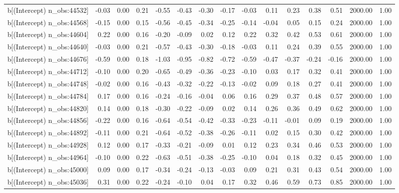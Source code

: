 \begin{table}[ht]
\begin{tabular}{rrrrrrrrrrrrrrr}
  b[(Intercept) n\_obs:44532] & -0.03 & 0.00 & 0.21 & -0.55 & -0.43 & -0.30 & -0.17 & -0.03 & 0.11 & 0.23 & 0.38 & 0.51 & 2000.00 & 1.00 \\ 
  b[(Intercept) n\_obs:44568] & -0.15 & 0.00 & 0.15 & -0.56 & -0.45 & -0.34 & -0.25 & -0.14 & -0.04 & 0.05 & 0.15 & 0.24 & 2000.00 & 1.00 \\ 
  b[(Intercept) n\_obs:44604] & 0.22 & 0.00 & 0.16 & -0.20 & -0.09 & 0.02 & 0.12 & 0.22 & 0.32 & 0.42 & 0.53 & 0.61 & 2000.00 & 1.00 \\ 
  b[(Intercept) n\_obs:44640] & -0.03 & 0.00 & 0.21 & -0.57 & -0.43 & -0.30 & -0.18 & -0.03 & 0.11 & 0.24 & 0.39 & 0.55 & 2000.00 & 1.00 \\ 
  b[(Intercept) n\_obs:44676] & -0.59 & 0.00 & 0.18 & -1.03 & -0.95 & -0.82 & -0.72 & -0.59 & -0.47 & -0.37 & -0.24 & -0.16 & 2000.00 & 1.00 \\ 
  b[(Intercept) n\_obs:44712] & -0.10 & 0.00 & 0.20 & -0.65 & -0.49 & -0.36 & -0.23 & -0.10 & 0.03 & 0.17 & 0.32 & 0.41 & 2000.00 & 1.00 \\ 
  b[(Intercept) n\_obs:44748] & -0.02 & 0.00 & 0.16 & -0.43 & -0.32 & -0.22 & -0.13 & -0.02 & 0.09 & 0.18 & 0.27 & 0.41 & 2000.00 & 1.00 \\ 
  b[(Intercept) n\_obs:44784] & 0.17 & 0.00 & 0.16 & -0.24 & -0.16 & -0.04 & 0.06 & 0.16 & 0.29 & 0.37 & 0.48 & 0.57 & 2000.00 & 1.00 \\ 
  b[(Intercept) n\_obs:44820] & 0.14 & 0.00 & 0.18 & -0.30 & -0.22 & -0.09 & 0.02 & 0.14 & 0.26 & 0.36 & 0.49 & 0.62 & 2000.00 & 1.00 \\ 
  b[(Intercept) n\_obs:44856] & -0.22 & 0.00 & 0.16 & -0.64 & -0.54 & -0.42 & -0.33 & -0.23 & -0.11 & -0.01 & 0.09 & 0.19 & 2000.00 & 1.00 \\ 
  b[(Intercept) n\_obs:44892] & -0.11 & 0.00 & 0.21 & -0.64 & -0.52 & -0.38 & -0.26 & -0.11 & 0.02 & 0.15 & 0.30 & 0.42 & 2000.00 & 1.00 \\ 
  b[(Intercept) n\_obs:44928] & 0.12 & 0.00 & 0.17 & -0.33 & -0.21 & -0.09 & 0.01 & 0.12 & 0.23 & 0.34 & 0.46 & 0.53 & 2000.00 & 1.00 \\ 
  b[(Intercept) n\_obs:44964] & -0.10 & 0.00 & 0.22 & -0.63 & -0.51 & -0.38 & -0.25 & -0.10 & 0.04 & 0.18 & 0.32 & 0.45 & 2000.00 & 1.00 \\ 
  b[(Intercept) n\_obs:45000] & 0.09 & 0.00 & 0.17 & -0.34 & -0.24 & -0.13 & -0.03 & 0.09 & 0.21 & 0.31 & 0.43 & 0.54 & 2000.00 & 1.00 \\ 
  b[(Intercept) n\_obs:45036] & 0.31 & 0.00 & 0.22 & -0.24 & -0.10 & 0.04 & 0.17 & 0.32 & 0.46 & 0.59 & 0.73 & 0.85 & 2000.00 & 1.00 \\ 

\end{tabular}
\end{table}
